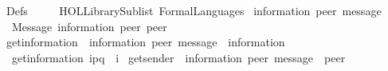 %
\begin{isabellebody}%
%
%
\isadelimtheory
\isanewline
%
\endisadelimtheory
%
\isatagtheory
{}\isamarkupfalse%
\ Defs\isanewline
\ \ \ \ \ {\isachardoublequoteopen}HOL{\isacharminus}{\kern0pt}Library{\isachardot}{\kern0pt}Sublist{\isachardoublequoteclose}\ FormalLanguages\isanewline
\isanewline
{}%
\endisatagtheory
{\isafoldtheory}%
%
\isadelimtheory
%
\endisadelimtheory
%
\isadelimdocument
%
\endisadelimdocument
%
\isatagdocument
%
\isamarkuptrue%
%
\isamarkuptrue%
%
\endisatagdocument
{\isafolddocument}%
%
\isadelimdocument
%
\endisadelimdocument
{}\isamarkupfalse%
\ {\isacharparenleft}{\kern0pt}{\isacharprime}{\kern0pt}information{\isacharcomma}{\kern0pt}\ {\isacharprime}{\kern0pt}peer{\isacharparenright}{\kern0pt}\ message\ {\isacharequal}{\kern0pt}\isanewline
\ \ Message\ {\isacharprime}{\kern0pt}information\ {\isacharprime}{\kern0pt}peer\ {\isacharprime}{\kern0pt}peer\ \ {\isacharparenleft}{\kern0pt}{\isachardoublequoteopen}{\isacharunderscore}{\kern0pt}\isactrlbsup {\isacharunderscore}{\kern0pt}{\isasymrightarrow}{\isacharunderscore}{\kern0pt}\isactrlesup {\isachardoublequoteclose}\ {\isacharbrackleft}{\kern0pt}{}{}{}{\isacharcomma}{\kern0pt}\ {}{}{}{\isacharcomma}{\kern0pt}\ {}{}{}{\isacharbrackright}{\kern0pt}\ {}{}{}{\isacharparenright}{\kern0pt}\isanewline
\isanewline
{}\isamarkupfalse%
\ get{\isacharunderscore}{\kern0pt}information\ {\isacharcolon}{\kern0pt}{\isacharcolon}{\kern0pt}\ {\isachardoublequoteopen}{\isacharparenleft}{\kern0pt}{\isacharprime}{\kern0pt}information{\isacharcomma}{\kern0pt}\ {\isacharprime}{\kern0pt}peer{\isacharparenright}{\kern0pt}\ message\ {\isasymRightarrow}\ {\isacharprime}{\kern0pt}information{\isachardoublequoteclose}\ \isanewline
\ \ {\isachardoublequoteopen}get{\isacharunderscore}{\kern0pt}information\ {\isacharparenleft}{\kern0pt}i\isactrlbsup p{\isasymrightarrow}q\isactrlesup {\isacharparenright}{\kern0pt}\ {\isacharequal}{\kern0pt}\ i{\isachardoublequoteclose}\isanewline
\isanewline
{}\isamarkupfalse%
\ get{\isacharunderscore}{\kern0pt}sender\ {\isacharcolon}{\kern0pt}{\isacharcolon}{\kern0pt}\ {\isachardoublequoteopen}{\isacharparenleft}{\kern0pt}{\isacharprime}{\kern0pt}information{\isacharcomma}{\kern0pt}\ {\isacharprime}{\kern0pt}peer{\isacharparenright}{\kern0pt}\ message\ {\isasymRightarrow}\ {\isacharprime}{\kern0pt}peer{\isachardoublequoteclose}\ \isanewline

\end{isabellebody}
